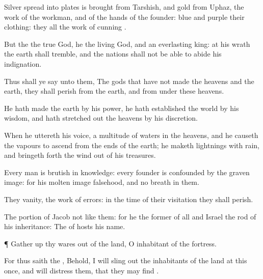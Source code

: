 {Silver spread into
plates is
brought from
Tarshish, and
gold from
Uphaz, the
work of the
workman, and of the
hands of the
founder:
blue and
purple
{} their
clothing: they
{} all the
work of
cunning
{}.

But the
{}
{} the
true
God, he
{} the
living
God, and an
everlasting
king: at his
wrath the
earth shall
tremble, and the
nations shall not be able to
abide his
indignation.

Thus shall ye
say unto them, The
gods that have
not
made the
heavens and the
earth,
{} they shall
perish from the
earth, and from
under
these
heavens.

He hath
made the
earth by his
power, he hath
established the
world by his
wisdom, and hath stretched
out the
heavens by his
discretion.

When he
uttereth his
voice,
{} a
multitude of
waters in the
heavens, and he causeth the
vapours to
ascend from the
ends of the
earth; he
maketh
lightnings with
rain, and bringeth
forth the
wind out of his
treasures.

Every
man is
brutish in
{}
knowledge: every
founder is
confounded by the graven
image: for his molten
image
{}
falsehood, and
{} no
breath in them.

They
{}
vanity,
{} the
work of
errors: in the
time of their
visitation they shall
perish.

The
portion of
Jacob
{} not like them: for he
{} the
former of all
{} and
Israel
{} the
rod of his
inheritance: The
{} of
hosts
{} his
name.


\par }{\PP {}¶ Gather
up thy
wares out of the
land, O
inhabitant of the
fortress.

For thus
saith the
{}, Behold, I will
sling out the
inhabitants of the
land at this
once, and will
distress them, that they may
find
{}.


}
